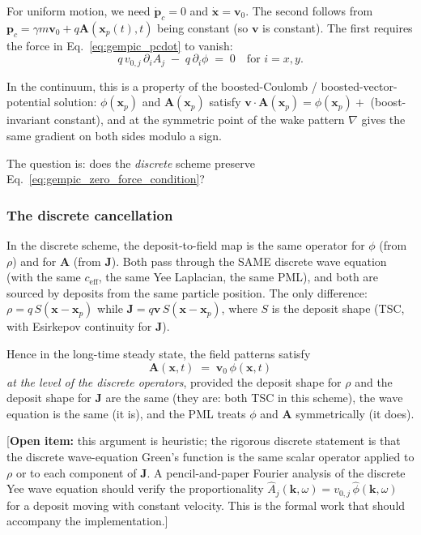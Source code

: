 \documentclass[11pt,a4paper]{article}
\newcommand{\vv}[1]{\mathbf{#1}}
\begin{document}
For uniform motion, we need
$\dot{\vv{p}}_c = 0$ and $\dot{\vv{x}} = \vv{v}_0$.
The second follows from $\vv{p}_c = \gamma m \vv{v}_0 +
q\vv{A}(\vv{x}_p(t), t)$ being constant (so $\vv{v}$ is constant).
The first requires the force in Eq.~\eqref{eq:gempic_pcdot} to
vanish:
\begin{equation}
\label{eq:gempic_zero_force_condition}
q\, v_{0,j}\,\partial_i A_j \;-\; q\,\partial_i \phi \;=\; 0
\quad\text{for } i = x, y.
\end{equation}

In the continuum, this is a property of the boosted-Coulomb /
boosted-vector-potential solution: $\phi(\vv{x}_p)$ and
$\vv{A}(\vv{x}_p)$ satisfy
$\vv{v}\cdot\vv{A}(\vv{x}_p) = \phi(\vv{x}_p) +$ (boost-invariant
constant), and at the symmetric point of the wake pattern $\nabla$
gives the same gradient on both sides modulo a sign.

The question is: does the \emph{discrete} scheme preserve
Eq.~\eqref{eq:gempic_zero_force_condition}?

\subsubsection*{The discrete cancellation}

In the discrete scheme, the deposit-to-field map is the same
operator for $\phi$ (from $\rho$) and for $\vv{A}$ (from $\vv{J}$).
Both pass through the SAME discrete wave equation (with the same
$c_{\mathrm{eff}}$, the same Yee Laplacian, the same PML), and both
are sourced by deposits from the same particle position.  The only
difference: $\rho = q \, S(\vv{x} - \vv{x}_p)$ while
$\vv{J} = q\vv{v}\, S(\vv{x} - \vv{x}_p)$, where $S$ is the deposit
shape (TSC, with Esirkepov continuity for $\vv{J}$).

Hence in the long-time steady state, the field patterns satisfy
\begin{equation}
\vv{A}(\vv{x}, t) \;=\; \vv{v}_0\, \phi(\vv{x}, t)
\end{equation}
\emph{at the level of the discrete operators}, provided the
deposit shape for $\rho$ and the deposit shape for $\vv{J}$ are
the same (they are: both TSC in this scheme), the wave equation
is the same (it is), and the PML treats $\phi$ and $\vv{A}$
symmetrically (it does).

[\textbf{Open item:} this argument is heuristic; the rigorous
discrete statement is that the discrete wave-equation Green's
function is the same scalar operator applied to $\rho$ or to each
component of $\vv{J}$.  A pencil-and-paper Fourier analysis of the
discrete Yee wave equation should verify the proportionality
$\hat{A}_j(\vv{k}, \omega) = v_{0,j}\,\hat{\phi}(\vv{k}, \omega)$
for a deposit moving with constant velocity.  This is the formal
work that should accompany the implementation.]
\end{document}
